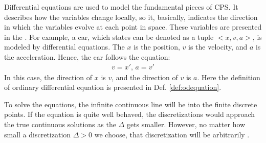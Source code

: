 Differential equations are used to model the fundamental pieces of CPS.
It describes how the variables change locally, so it, basically, indicates the direction in which the variables evolve at each point in space.
These variables are presented in the .
For example, a car, which states can be denoted as a tuple $<x, v, a>$, 
is modeled by differential equations.
The $x$ is the position, $v$ is the velocity, and $a$ is the acceleration.
Hence, the car follows the equation:
\begin{align*}
  v = x' \text{, } a = v'
\end{align*}
In this case, the direction of $x$ is $v$, and the direction of $v$ is $a$.
Here the definition of ordinary differential equation is presented in Def. \ref{def:odequation}.

To solve the equations, the infinite continuous line will be  into the finite discrete points.
If the equation is quite well behaved, the discretizations would approach the true continuous solutions as the $\Delta$ gets smaller.
However, no matter how small a discretization $\Delta > 0$ we choose, that discretization will be arbitrarily .

